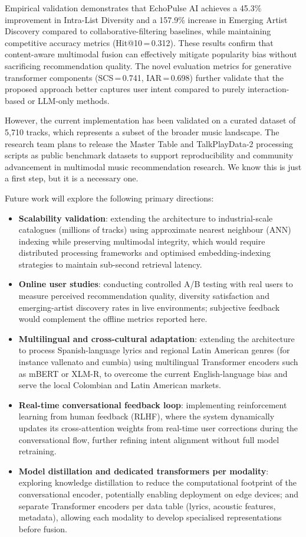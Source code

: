 \documentclass[]{ceurart}
\begin{document}
Empirical validation demonstrates that EchoPulse AI achieves a 45.3\%
improvement in Intra-List Diversity and a 157.9\% increase in Emerging Artist
Discovery compared to collaborative-filtering baselines, while maintaining
competitive accuracy metrics (Hit@10\,=\,0.312). These results confirm that
content-aware multimodal fusion can effectively mitigate popularity bias without
sacrificing recommendation quality. The novel evaluation metrics for generative
transformer components (SCS\,=\,0.741, IAR\,=\,0.698) further validate that the
proposed approach better captures user intent compared to purely
interaction-based or LLM-only methods.

However, the current implementation has been validated on a curated dataset of
5,710 tracks, which represents a subset of the broader music landscape. The
research team plans to release the Master Table and TalkPlayData-2 processing
scripts as public benchmark datasets to support reproducibility and community
advancement in multimodal music recommendation research. We know this is just a
first step, but it is a necessary one.

Future work will explore the following primary directions:
\begin{itemize}
  \item \textbf{Scalability validation}: extending the architecture to
    industrial-scale catalogues (millions of tracks) using approximate nearest
    neighbour (ANN) indexing while preserving multimodal integrity, which would
    require distributed processing frameworks and optimised embedding-indexing
    strategies to maintain sub-second retrieval latency.
  \item \textbf{Online user studies}: conducting controlled A/B testing with
    real users to measure perceived recommendation quality, diversity
    satisfaction and emerging-artist discovery rates in live environments;
    subjective feedback would complement the offline metrics reported here.
  \item \textbf{Multilingual and cross-cultural adaptation}: extending the
    architecture to process Spanish-language lyrics and regional Latin American
    genres (for instance vallenato and cumbia) using multilingual Transformer
    encoders such as mBERT or XLM-R, to overcome the current English-language
    bias and serve the local Colombian and Latin American markets.
  \item \textbf{Real-time conversational feedback loop}: implementing
    reinforcement learning from human feedback (RLHF), where the system
    dynamically updates its cross-attention weights from real-time user
    corrections during the conversational flow, further refining intent
    alignment without full model retraining.
  \item \textbf{Model distillation and dedicated transformers per modality}:
    exploring knowledge distillation to reduce the computational footprint of
    the conversational encoder, potentially enabling deployment on edge devices;
    and separate Transformer encoders per data table (lyrics, acoustic features,
    metadata), allowing each modality to develop specialised representations
    before fusion.
\end{itemize}
\end{document}
